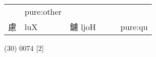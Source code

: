 \documentclass[14pt,a4paper]{scrartcl}
\begin{document}
\begin{longtable}[c]{@{}llllll@{}}
\begin{minipage}[t]{0.14\columnwidth}
\strut\end{minipage} &
\begin{minipage}[t]{0.14\columnwidth}\raggedright\strut
pure:other
\strut\end{minipage}\tabularnewline
\begin{minipage}[t]{0.14\columnwidth}\raggedright\strut
慮
\strut\end{minipage} &
\begin{minipage}[t]{0.14\columnwidth}\raggedright\strut
luX
\strut\end{minipage} &
\begin{minipage}[t]{0.14\columnwidth}\raggedright\strut
鑢 ljoH
\strut\end{minipage} &
\begin{minipage}[t]{0.14\columnwidth}\raggedright\strut
\strut\end{minipage} &
\begin{minipage}[t]{0.14\columnwidth}\raggedright\strut
\strut\end{minipage} &
\begin{minipage}[t]{0.14\columnwidth}\raggedright\strut
pure:qu
\strut\end{minipage}\tabularnewline
\bottomrule
\end{longtable}

(30) 0074 {[}2{]}
\end{document}

